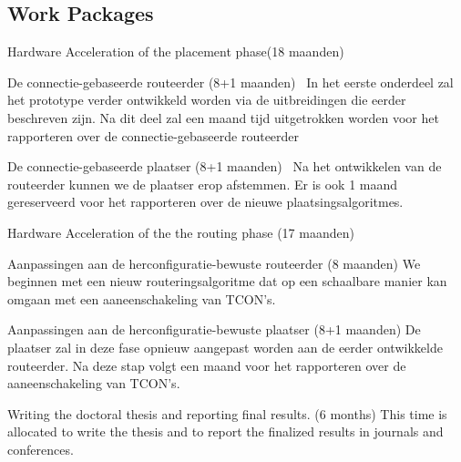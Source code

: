 \documentclass[a4paper,oneside,12pt]{article}
\begin{document}
\subsection{Work Packages}
\begin{description*}
\item[Hardware Acceleration of the placement phase(18 maanden)]\

\begin{description*}
\item[De connectie-gebaseerde routeerder (8+1 maanden)]\
In het eerste onderdeel zal het prototype verder ontwikkeld worden via de uitbreidingen die eerder beschreven zijn. Na dit deel zal een maand tijd uitgetrokken worden voor het rapporteren over de connectie-gebaseerde routeerder
\item[De connectie-gebaseerde plaatser (8+1 maanden)]\
Na het ontwikkelen van de routeerder kunnen we de plaatser erop afstemmen. Er is ook 1 maand gereserveerd voor het rapporteren over de nieuwe plaatsingsalgoritmes.
\end{description*}

\item[Hardware Acceleration of the the routing phase (17 maanden)]\

\begin{description*}
\item[Aanpassingen aan de herconfiguratie-bewuste routeerder (8 maanden)] 
We beginnen met een nieuw routeringsalgoritme dat op een schaalbare manier kan omgaan met een aaneenschakeling van TCON's.
\item[Aanpassingen aan de herconfiguratie-bewuste plaatser (8+1 maanden)]
De plaatser zal in deze fase opnieuw aangepast worden aan de eerder ontwikkelde routeerder. Na deze stap volgt een maand voor het rapporteren over de aaneenschakeling van TCON's.
\end{description*}

\item[Writing the doctoral thesis and reporting final results. (6 months)] This time is allocated to write the thesis and to report the finalized results in journals and conferences.  

\end{description*}
\end{document}
